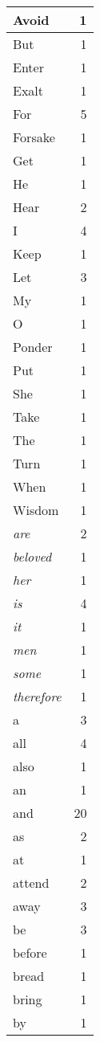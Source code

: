 \begin{center}
\begin{longtable}{l|r}
Avoid & 1\\ \hline 
But & 1\\ \hline 
Enter & 1\\ \hline 
Exalt & 1\\ \hline 
For & 5\\ \hline 
Forsake & 1\\ \hline 
Get & 1\\ \hline 
He & 1\\ \hline 
Hear & 2\\ \hline 
I & 4\\ \hline 
Keep & 1\\ \hline 
Let & 3\\ \hline 
My & 1\\ \hline 
O & 1\\ \hline 
Ponder & 1\\ \hline 
Put & 1\\ \hline 
She & 1\\ \hline 
Take & 1\\ \hline 
The & 1\\ \hline 
Turn & 1\\ \hline 
When & 1\\ \hline 
Wisdom & 1\\ \hline 
\emph{are} & 2\\ \hline 
\emph{beloved} & 1\\ \hline 
\emph{her} & 1\\ \hline 
\emph{is} & 4\\ \hline 
\emph{it} & 1\\ \hline 
\emph{men} & 1\\ \hline 
\emph{some} & 1\\ \hline 
\emph{therefore} & 1\\ \hline 
a & 3\\ \hline 
all & 4\\ \hline 
also & 1\\ \hline 
an & 1\\ \hline 
and & 20\\ \hline 
as & 2\\ \hline 
at & 1\\ \hline 
attend & 2\\ \hline 
away & 3\\ \hline 
be & 3\\ \hline 
before & 1\\ \hline 
bread & 1\\ \hline 
bring & 1\\ \hline 
by & 1\\ \hline 

\end{longtable}
\end{center}
